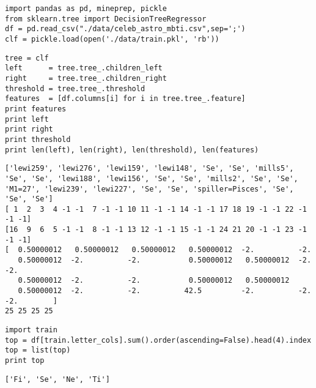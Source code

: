 \documentclass[12pt,fleqn]{article}\usepackage{../common}
\begin{document}
\begin{verbatim}
import pandas as pd, mineprep, pickle
from sklearn.tree import DecisionTreeRegressor
df = pd.read_csv("./data/celeb_astro_mbti.csv",sep=';')
clf = pickle.load(open('./data/train.pkl', 'rb'))
\end{verbatim}

\begin{verbatim}
tree = clf
left      = tree.tree_.children_left
right     = tree.tree_.children_right
threshold = tree.tree_.threshold
features  = [df.columns[i] for i in tree.tree_.feature]
print features
print left
print right
print threshold
print len(left), len(right), len(threshold), len(features)
\end{verbatim}

\begin{verbatim}
['lewi259', 'lewi276', 'lewi159', 'lewi148', 'Se', 'Se', 'mills5', 'Se', 'Se', 'lewi188', 'lewi156', 'Se', 'Se', 'mills2', 'Se', 'Se', 'M1=27', 'lewi239', 'lewi227', 'Se', 'Se', 'spiller=Pisces', 'Se', 'Se', 'Se']
[ 1  2  3  4 -1 -1  7 -1 -1 10 11 -1 -1 14 -1 -1 17 18 19 -1 -1 22 -1 -1 -1]
[16  9  6  5 -1 -1  8 -1 -1 13 12 -1 -1 15 -1 -1 24 21 20 -1 -1 23 -1 -1 -1]
[  0.50000012   0.50000012   0.50000012   0.50000012  -2.          -2.
   0.50000012  -2.          -2.           0.50000012   0.50000012  -2.          -2.
   0.50000012  -2.          -2.           0.50000012   0.50000012
   0.50000012  -2.          -2.          42.5         -2.          -2.          -2.        ]
25 25 25 25
\end{verbatim}

\begin{verbatim}
import train
top = df[train.letter_cols].sum().order(ascending=False).head(4).index
top = list(top)
print top
\end{verbatim}

\begin{verbatim}
['Fi', 'Se', 'Ne', 'Ti']
\end{verbatim}
\end{document}
